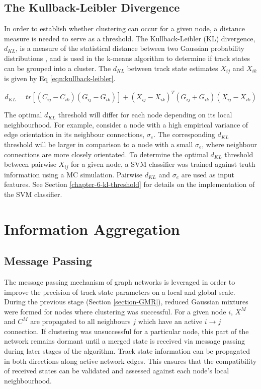 \subsection{The Kullback-Leibler Divergence}
In order to establish whether clustering can occur for a given node, a distance measure is needed to serve as a threshold. The Kullback-Leibler (KL) divergence, $d_{KL}$, is a measure of the statistical distance between two Gaussian probability distributions \cite{KL, FRUHWIRTH19971}, and is used in the k-means algorithm to determine if track states can be grouped into a cluster. The $d_{KL}$ between track state estimates $X_{ij}$ and $X_{ik}$ is given by Eq \eqref{eqn:kullback-leibler}.

\begin{equation}
    d_{KL} = tr[(C_{ij} - C_{ik})(G_{ij} - G_{ik})] + (X_{ij} - X_{ik})^{T}(G_{ij} + G_{ik})(X_{ij} - X_{ik})
    \label{eqn:kullback-leibler}
\end{equation}

The optimal $d_{KL}$ threshold will differ for each node depending on its local neighbourhood. For example, consider a node with a high empirical variance of edge orientation in its neighbour connections, $\sigma_{e}$. The corresponding $d_{KL}$ threshold will be larger in comparison to a node with a small $\sigma_{e}$, where neighbour connections are more closely orientated. To determine the optimal $d_{KL}$ threshold between pairwise $X_{ij}$ for a given node, a SVM classifier was trained against truth information using a MC simulation. Pairwise $d_{KL}$ and $\sigma_{e}$ are used as input features. See Section \ref{chapter-6-kl-threshold} for details on the implementation of the SVM classifier.





\section{Information Aggregation}

\subsection{Message Passing}
The message passing mechanism of graph networks is leveraged in order to improve the precision of track state parameters on a local and global scale. During the previous stage (Section \ref{section-GMR}), reduced Gaussian mixtures were formed for nodes where clustering was successful. For a given node $i$, $X^M$ and $C^M$ are propagated to all neighbours $j$ which have an active $i \rightarrow j$ connection. If clustering was unsuccessful for a particular node, this part of the network remains dormant until a merged state is received via message passing during later stages of the algorithm. Track state information can be propagated in both directions along active network edges. This ensures that the compatibility of received states can be validated and assessed against each node's local neighbourhood.


